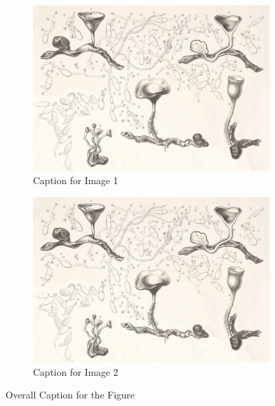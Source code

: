\begin{figure}[!htpb]
    \centering
    \begin{subfigure}{0.45\textwidth}
        \includegraphics[width=\textwidth]{Figures/PezizaTuberosa.jpg}
        \caption{Caption for Image 1}
        \label{fig:figure-02.1}
    \end{subfigure}
    \hspace{.5cm} %
    \begin{subfigure}{0.45\textwidth}
        \includegraphics[width=\textwidth]{Figures/PezizaTuberosa.jpg}
        \caption{Caption for Image 2}
        \label{fig:figure-02.2}
    \end{subfigure}
    \caption{Overall Caption for the Figure}
    \label{fig:figure-02}
\end{figure}


